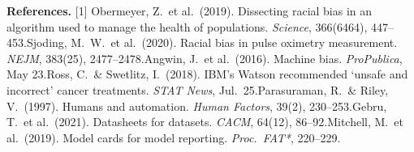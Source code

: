 \documentclass[11pt]{article}
\begin{document}
{\footnotesize
\textbf{References.}
[1] Obermeyer, Z.\ et al.\ (2019). Dissecting racial bias in an algorithm used to manage the health of populations. \textit{Science}, 366(6464), 447--453.\;
[2] Sjoding, M.~W.\ et al.\ (2020). Racial bias in pulse oximetry measurement. \textit{NEJM}, 383(25), 2477--2478.\;
[3] Angwin, J.\ et al.\ (2016). Machine bias. \textit{ProPublica}, May 23.\;
[4] Ross, C.\ \& Swetlitz, I.\ (2018). IBM's Watson recommended `unsafe and incorrect' cancer treatments. \textit{STAT News}, Jul.\ 25.\;
[5] Parasuraman, R.\ \& Riley, V.\ (1997). Humans and automation. \textit{Human Factors}, 39(2), 230--253.\;
[6] Gebru, T.\ et al.\ (2021). Datasheets for datasets. \textit{CACM}, 64(12), 86--92.\;
[7] Mitchell, M.\ et al.\ (2019). Model cards for model reporting. \textit{Proc.\ FAT*}, 220--229.
}
\end{document}
